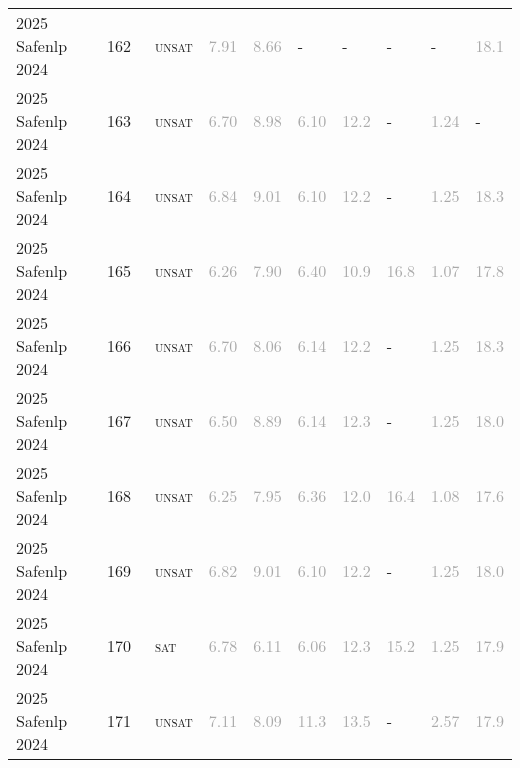 \begin{center}
{\begin{longtable}{@{}llllllllll@{}}
2025 Safenlp 2024 & 162 & ~\textsc{unsat} & \textcolor{darkgray}{7.91} & \textcolor{darkgray}{8.66} & - & - & - & - & \textcolor{darkgray}{18.1} \\
2025 Safenlp 2024 & 163 & ~\textsc{unsat} & \textcolor{darkgray}{6.70} & \textcolor{darkgray}{8.98} & \textcolor{darkgray}{6.10} & \textcolor{darkgray}{12.2} & - & \textcolor{darkgray}{1.24} & - \\
2025 Safenlp 2024 & 164 & ~\textsc{unsat} & \textcolor{darkgray}{6.84} & \textcolor{darkgray}{9.01} & \textcolor{darkgray}{6.10} & \textcolor{darkgray}{12.2} & - & \textcolor{darkgray}{1.25} & \textcolor{darkgray}{18.3} \\
2025 Safenlp 2024 & 165 & ~\textsc{unsat} & \textcolor{darkgray}{6.26} & \textcolor{darkgray}{7.90} & \textcolor{darkgray}{6.40} & \textcolor{darkgray}{10.9} & \textcolor{darkgray}{16.8} & \textcolor{darkgray}{1.07} & \textcolor{darkgray}{17.8} \\
2025 Safenlp 2024 & 166 & ~\textsc{unsat} & \textcolor{darkgray}{6.70} & \textcolor{darkgray}{8.06} & \textcolor{darkgray}{6.14} & \textcolor{darkgray}{12.2} & - & \textcolor{darkgray}{1.25} & \textcolor{darkgray}{18.3} \\
2025 Safenlp 2024 & 167 & ~\textsc{unsat} & \textcolor{darkgray}{6.50} & \textcolor{darkgray}{8.89} & \textcolor{darkgray}{6.14} & \textcolor{darkgray}{12.3} & - & \textcolor{darkgray}{1.25} & \textcolor{darkgray}{18.0} \\
2025 Safenlp 2024 & 168 & ~\textsc{unsat} & \textcolor{darkgray}{6.25} & \textcolor{darkgray}{7.95} & \textcolor{darkgray}{6.36} & \textcolor{darkgray}{12.0} & \textcolor{darkgray}{16.4} & \textcolor{darkgray}{1.08} & \textcolor{darkgray}{17.6} \\
2025 Safenlp 2024 & 169 & ~\textsc{unsat} & \textcolor{darkgray}{6.82} & \textcolor{darkgray}{9.01} & \textcolor{darkgray}{6.10} & \textcolor{darkgray}{12.2} & - & \textcolor{darkgray}{1.25} & \textcolor{darkgray}{18.0} \\
2025 Safenlp 2024 & 170 & ~\textsc{sat} & \textcolor{darkgray}{6.78} & \textcolor{darkgray}{6.11} & \textcolor{darkgray}{6.06} & \textcolor{darkgray}{12.3} & \textcolor{darkgray}{15.2} & \textcolor{darkgray}{1.25} & \textcolor{darkgray}{17.9} \\
2025 Safenlp 2024 & 171 & ~\textsc{unsat} & \textcolor{darkgray}{7.11} & \textcolor{darkgray}{8.09} & \textcolor{darkgray}{11.3} & \textcolor{darkgray}{13.5} & - & \textcolor{darkgray}{2.57} & \textcolor{darkgray}{17.9} \\

\end{longtable}}
\end{center}
